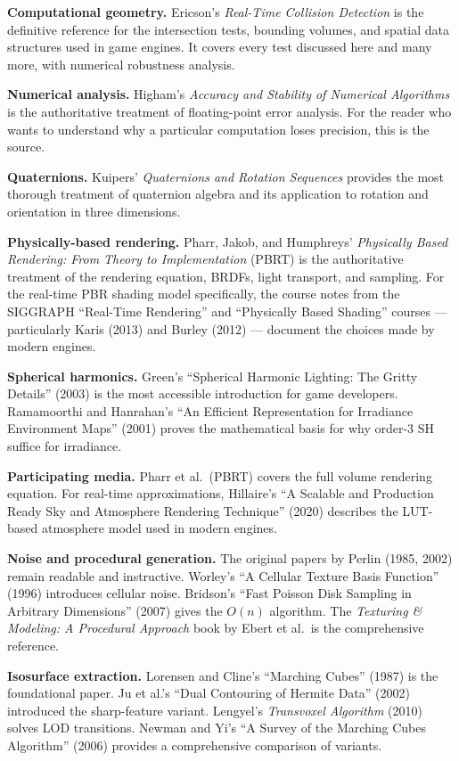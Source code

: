 \documentclass[
  11pt,
  letterpaper,
  DIV=11,
  numbers=noendperiod,
  twoside,
  open=right]{scrreprt}
\begin{document}
\textbf{Computational geometry.} Ericson's \emph{Real-Time Collision
Detection} is the definitive reference for the intersection tests,
bounding volumes, and spatial data structures used in game engines. It
covers every test discussed here and many more, with numerical
robustness analysis.

\textbf{Numerical analysis.} Higham's \emph{Accuracy and Stability of
Numerical Algorithms} is the authoritative treatment of floating-point
error analysis. For the reader who wants to understand why a particular
computation loses precision, this is the source.

\textbf{Quaternions.} Kuipers' \emph{Quaternions and Rotation Sequences}
provides the most thorough treatment of quaternion algebra and its
application to rotation and orientation in three dimensions.

\textbf{Physically-based rendering.} Pharr, Jakob, and Humphreys'
\emph{Physically Based Rendering: From Theory to Implementation} (PBRT)
is the authoritative treatment of the rendering equation, BRDFs, light
transport, and sampling. For the real-time PBR shading model
specifically, the course notes from the SIGGRAPH ``Real-Time Rendering''
and ``Physically Based Shading'' courses --- particularly Karis (2013)
and Burley (2012) --- document the choices made by modern engines.

\textbf{Spherical harmonics.} Green's ``Spherical Harmonic Lighting: The
Gritty Details'' (2003) is the most accessible introduction for game
developers. Ramamoorthi and Hanrahan's ``An Efficient Representation for
Irradiance Environment Maps'' (2001) proves the mathematical basis for
why order-3 SH suffice for irradiance.

\textbf{Participating media.} Pharr et al.~(PBRT) covers the full volume
rendering equation. For real-time approximations, Hillaire's ``A
Scalable and Production Ready Sky and Atmosphere Rendering Technique''
(2020) describes the LUT-based atmosphere model used in modern engines.

\textbf{Noise and procedural generation.} The original papers by Perlin
(1985, 2002) remain readable and instructive. Worley's ``A Cellular
Texture Basis Function'' (1996) introduces cellular noise. Bridson's
``Fast Poisson Disk Sampling in Arbitrary Dimensions'' (2007) gives the
\(O(n)\) algorithm. The \emph{Texturing \& Modeling: A Procedural
Approach} book by Ebert et al.~is the comprehensive reference.

\textbf{Isosurface extraction.} Lorensen and Cline's ``Marching Cubes''
(1987) is the foundational paper. Ju et al.'s ``Dual Contouring of
Hermite Data'' (2002) introduced the sharp-feature variant. Lengyel's
\emph{Transvoxel Algorithm} (2010) solves LOD transitions. Newman and
Yi's ``A Survey of the Marching Cubes Algorithm'' (2006) provides a
comprehensive comparison of variants.
\end{document}
